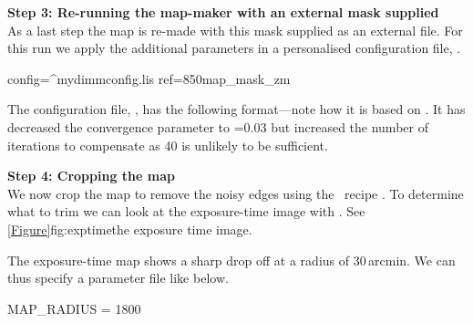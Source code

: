 \documentclass[11pt,oneside,chapters]{starlink}
\begin{document}


\textbf{Step 3: Re-running the map-maker with an external mask supplied}
\vspace{0.2cm}\\
As a last step the map is re-made with this mask supplied as an external
file. For this run we apply the additional parameters in a
personalised configuration file, .
\begin{terminalv}
config=^mydimmconfig.lis ref=850map_mask_zm
\end{terminalv}

The configuration file, , has the following
format---note how it is based on
. It has decreased the
convergence parameter to =0.03 but increased the number
of iterations to compensate as 40 is unlikely to be sufficient.

\textbf{Step 4: Cropping the map}
\vspace{0.2cm}\\
We now crop the map to remove the noisy edges using the \picard\ recipe
. To determine what to trim we can look
at the exposure-time image with \gaia.  See
\cref{Figure}{fig:exptime}{the exposure time image}.


The exposure-time map shows a sharp drop off at a radius of 30\,arcmin.
We can thus specify a parameter file like below.
\begin{center}
\begin{terminalv}
MAP_RADIUS = 1800
\end{terminalv}
\end{center}
\end{document}
